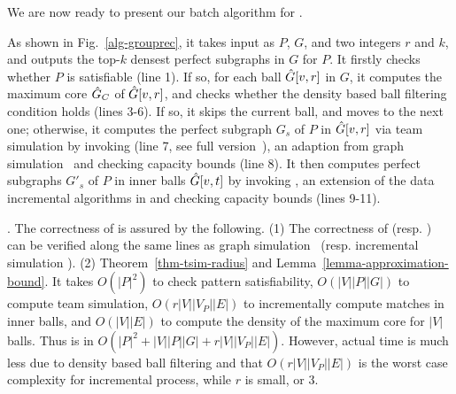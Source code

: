 We are now ready to present our batch algorithm for \teamF{}.

 As shown in Fig.~\ref{alg-grouprec}, it takes input as $P$, $G$, and two integers $r$ and $k$, and outputs the top-$k$ densest perfect subgraphs in $G$ for $P$.
It firstly checks whether $P$ is satisfiable (line 1).
If so, for each ball $\hat{G}{[v,r]}$ in $G$, it computes the maximum core $\hat{G}{}_{C}$ of $\hat{G}{[v,r]}$, and checks whether the
density based ball filtering condition holds (lines 3-6).
If so, it skips the current ball, and moves to the next one;
otherwise, it computes the perfect subgraph $G_{s}$ of $P$ in $\hat{G}{[v,r]}$ via team simulation by invoking \rgraphsim (line 7, see full version~\cite{fullvldb18}),
an adaption from graph simulation~\cite{infsimu95,FanLMTWW10} and checking capacity bounds (line 8).
It then computes perfect subgraphs $G'_{s}$ of $P$ in inner balls $\hat{G}{[v,t]}$ by invoking \incsim, an extension of the data incremental algorithms in \cite{FanWW13-tods} and checking capacity bounds (lines 9-11).

. The correctness of \grouprec is assured by the following.
(1) The correctness of \rgraphsim (resp. \incsim) can be verified along the same lines as graph simulation~\cite{infsimu95} (resp. incremental simulation \cite{FanWW13-tods}).
(2) Theorem~\ref{thm-tsim-radius} and Lemma~\ref{lemma-approximation-bound}.
It takes $O(|P|^2)$ to check pattern satisfiability, $O(|V||P||G|)$ to compute team simulation, $O(r|V||V_{P}||E|)$ to incrementally compute matches in inner balls, and $O(|V||E|)$  to compute the density of the maximum core for $|V|$ balls.
Thus \grouprec is in $O(|P|^2+|V||P||G|+r|V||V_{P}||E|)$. However, actual time is much less due to density based ball filtering and that  $O(r|V||V_{P}||E|)$ is the worst case complexity for incremental process, while $r$ is small,  or 3.



